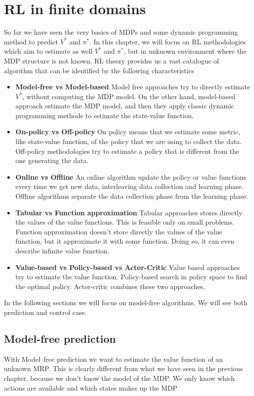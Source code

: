 \documentclass[main.tex]{subfiles}
\begin{document}
\section{RL in finite domains}
So far we have seen the very basics of MDPs and some dynamic programming method to predict $V^*$ and $\pi^*$. In this chapter, we will focus on RL methodologies which aim to estimate as well $V^*$ and $\pi^*$, but in unknown environment where the MDP structure is not known.
RL theory provides us a vast catalogue of algorithm that can be identified by the following characteristics
\begin{itemize}
    \item \textbf{Model-free vs Model-based} Model free approaches try to directly estimate $V^*$, without computing the MDP model. On the other hand, model-based approach estimate the MDP model, and then they apply classic dynamic programming methods to estimate the state-value function.
    \item \textbf{On-policy vs Off-policy} On policy means that we estimate some metric, like state-value function, of the policy that we are using to collect the data. Off-policy methodologies try to estimate a policy that is different from the one generating the data.
    \item \textbf{Online vs Offline} An online algorithm update the policy or value functions every time we get new data, interleaving data collection and learning phase. Offline algorithms separate the data collection phase from the learning phase.
    \item \textbf{Tabular vs Function approximation} Tabular approaches stores directly the values of the value functions. This is feasible only on small problems. Function approximation doesn't store directly the values of the value function, but it approximate it with some function. Doing so, it can even describe infinite value function.
    \item \textbf{Value-based vs Policy-based vs Actor-Critic} Value based approaches try to estimate the value function. Policy-based search in policy space to find the optimal policy. Actor-critic combines these two approaches.
\end{itemize}
In the following sections we will focus on model-free algorithms. We will see both prediction and control case.
\subsection{Model-free prediction}
With Model–free prediction we want to estimate the value function of an unknown MRP\footnotemark. This is clearly different from what we have seen in the previous chapter, because we don't know the model of the MDP. We only know which actions are available and which states makes up the MDP
\end{document}
